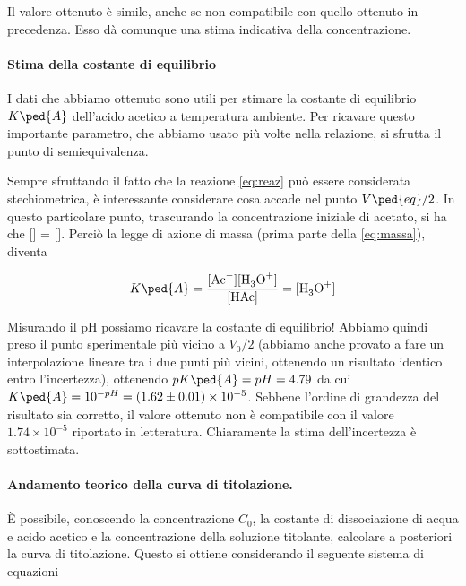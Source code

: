 Il valore ottenuto è simile, anche se non compatibile con quello ottenuto in precedenza.
Esso dà comunque una stima indicativa della concentrazione.

\paragraph{Stima della costante di equilibrio}

I dati che abbiamo ottenuto sono utili per stimare la costante di equilibrio $K\ped{A}$ dell'acido
acetico a temperatura ambiente. Per ricavare questo importante parametro, che abbiamo usato più
volte nella relazione, si sfrutta il punto di semiequivalenza.

Sempre sfruttando il fatto che la reazione \eqref{eq:reaz} può essere considerata stechiometrica,
è interessante considerare cosa accade nel punto $V\ped{eq}/2$. In questo particolare punto,
trascurando la concentrazione iniziale di acetato, si ha che [] = [].
Perciò la legge di azione di massa (prima parte della \eqref{eq:massa}), diventa 

\begin{equation}
    K\ped{A} = \frac{[\ce{Ac-}][\ce{H3O+}]}{[\ce{HAc}]} = [\ce{H3O+}]
\end{equation}

Misurando il pH possiamo ricavare la costante di equilibrio! Abbiamo quindi preso il punto sperimentale
più vicino a $V_0/2$ (abbiamo anche provato a fare un interpolazione lineare tra i due punti più
vicini, ottenendo un risultato identico entro l'incertezza), ottenendo $pK\ped{A} = pH = 4.79$ da cui
$K\ped{A} = 10^{-pH} = (1.62 \pm 0.01) \times 10^{-5}$. Sebbene l'ordine di grandezza del risultato sia corretto, il valore ottenuto non è compatibile con il valore $1.74 \times 10^{-5}$ riportato in letteratura.
Chiaramente la stima dell'incertezza è sottostimata.

\paragraph{Andamento teorico della curva di titolazione.}

È possibile, conoscendo la concentrazione $C_0$, la costante di dissociazione di
acqua e acido acetico e la concentrazione della soluzione titolante,
calcolare a posteriori la curva di titolazione.
Questo si ottiene considerando il seguente sistema di equazioni

